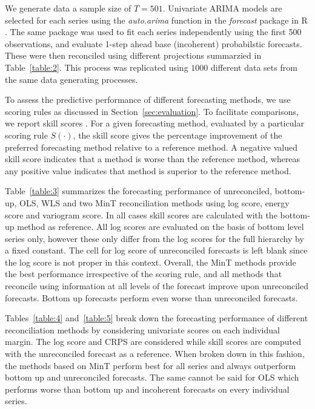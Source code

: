 \documentclass[a4paper, 11pt]{article}
\theoremstyle{theo}
\theoremstyle{definition}
\begin{document}
We generate data a sample size of $T=501$. Univariate ARIMA models are selected for each series using the \textit{auto.arima} function in the \textit{forecast} package \citep{hyndman2017forecasting} in R \citep{Rcore}.  The same package was used to fit each series independently using the first 500 observations, and evaluate 1-step ahead base (incoherent) probabilstic forecasts. These were then reconciled using different projections summarzied in Table~\ref{table:2}. This process was replicated using $1000$ different data sets from the same data generating processes.

To assess the predictive performance of different forecasting methods, we use scoring rules as discussed in Section~\ref{sec:evaluation}. To facilitate comparisons, we report skill scores \citep{Gneiting2007}. For a given forecasting method, evaluated by a particular scoring rule $S(\cdot)$, the skill score %
gives the percentage improvement of the preferred forecasting method relative to a reference method. A negative valued skill score indicates that a method is worse than the reference method, whereas any positive value indicates that method is superior to the reference method.

Table~\ref{table:3} summarizes the forecasting performance of unreconciled, bottom-up, OLS, WLS and two MinT reconciliation methods using log score, energy score and variogram score.  In all cases skill scores are calculated with the bottom-up method as reference.  All log scores are evaluated on the basis of bottom level series only, however these only differ from the log scores for the full hierarchy by a fixed constant.  The cell for log score of unreconciled forecasts is left blank since the log score is not proper in this context.  Overall, the MinT methods provide the best performance irrespective of the scoring rule, and all methods that reconcile using information at all levels of the forecast improve upon unreconciled forecasts.  Bottom up forecasts perform even worse than unreconciled forecasts.

Tables~\ref{table:4} and~\ref{table:5} break down the forecasting performance of different reconciliation methods by considering univariate scores on each individual margin. The log score and CRPS are considered while skill scores are computed with the unreconciled forecast as a reference.  When broken down in this fashion, the methods based on MinT perform best for all series and always outperform bottom up and unreconciled forecasts.  The same cannot be said for OLS which performs worse than bottom up and incoherent forecasts on every individual series.
\end{document}
